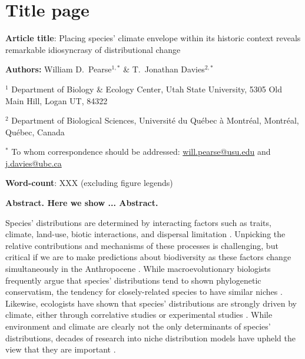 \documentclass[12pt]{report}
\begin{document}
\section*{Title page}
\textbf{Article title}: Placing species' climate envelope within its
historic context reveals remarkable idiosyncrasy of distributional
change

\textbf{Authors:} William D.\ Pearse$^{1,*}$ \& T.\ Jonathan
Davies$^{2,*}$

$^1$ Department of Biology \& Ecology Center, Utah State University,
5305 Old Main Hill, Logan UT, 84322

$^2$ Department of Biological Sciences, Universit\'{e} du Qu\'{e}bec
\`{a} Montr\'{e}al, Montr\'{e}al, Qu\'{e}bec, Canada

$^*$ To whom correspondence should be addressed:
\url{will.pearse@usu.edu} and \url{j.davies@ubc.ca}

\textbf{Word-count}: XXX (excluding figure legends)

\clearpage
\textbf{Abstract. Here we
  show ... Abstract.}

Species' distributions are determined by interacting factors such as
traits, climate, land-use, biotic interactions, and dispersal
limitation \supercite{Pulliam2000,Ricklefs2004,Vellend2010}. Unpicking
the relative contributions and mechanisms of these processes is
challenging, but critical if we are to make predictions about
biodiversity as these factors change simultaneously in the
Anthropocene \supercite{Heller2009,Oliver2014,Urban2015}. While
macroevolutionary biologists frequently argue that species'
distributions tend to shown phylogenetic conservatism, the tendency
for closely-related species to have similar niches
\supercite{Wiens2004,Wiens2010}. Likewise, ecologists have shown that
species' distributions are strongly driven by climate, either through
correlative studies \supercite{xxx} or experimental studies
\supercite{xxx}. While environment and climate are clearly not the
only determinants of species' distributions, decades of research into
niche distribution models have upheld the view that they are important
\supercite{xxx}.
\end{document}
